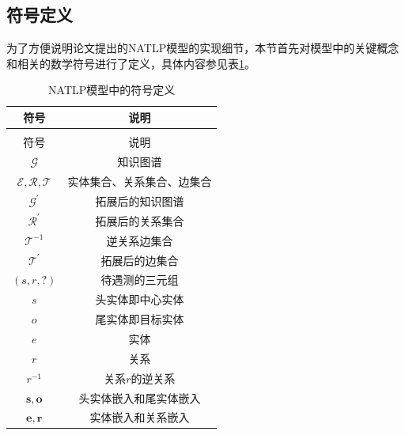 \subsection{符号定义}

为了方便说明论文提出的NATLP模型的实现细节，本节首先对模型中的关键概念和相关的数学符号进行了定义，具体内容参见表\ref{definition}。

\setlength{\tabcolsep}{20pt}

\begin{longtable}[htbp]{cc}
  \caption{NATLP模型中的符号定义}
  \label{definition}\\
  \toprule
  符号  & 说明\\
  \midrule
  \endfirsthead
  \caption{NATLP模型中的符号定义}\\
  \toprule
  符号  & 说明 \\
  \midrule
  \endhead
  \hline
  \endfoot
  \bottomrule
  \endlastfoot
  $\mathcal{G}$   &   知识图谱      \\
  $\mathcal{E}, \mathcal{R}, \mathcal{T}$   &   实体集合、关系集合、边集合      \\
  $\mathcal{G}^\prime$  &  拓展后的知识图谱      \\
  $\mathcal{R}^{\prime}$   &   拓展后的关系集合      \\
  $\mathcal{T}^{-1}$   &   逆关系边集合      \\
  $\mathcal{T}^{\prime}$   &   拓展后的边集合      \\
  $(s,r,?)$  &   待遇测的三元组      \\
  $s$   &   头实体即中心实体      \\
  $o$   &   尾实体即目标实体      \\
  $e$   &   实体      \\
  $r$   &   关系      \\
  $r^{-1}$   &   关系$r$的逆关系      \\
  $\boldsymbol{s},\boldsymbol{o}$ & 头实体嵌入和尾实体嵌入\\
  $\boldsymbol{e},\boldsymbol{r}$ & 实体嵌入和关系嵌入\\


\end{longtable}

